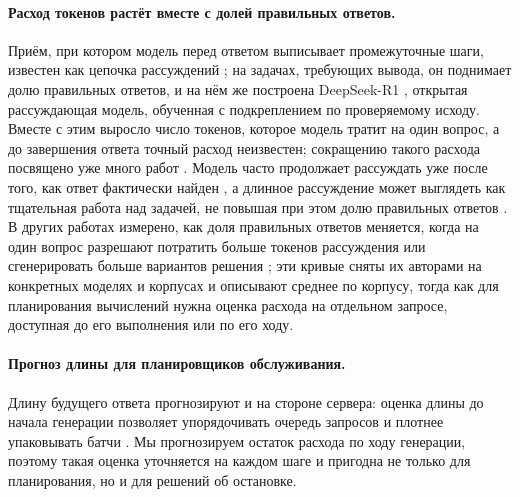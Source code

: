 \documentclass[11pt]{article}
\begin{document}
\paragraph{Расход токенов растёт вместе с долей правильных ответов.} Приём, при котором модель перед ответом выписывает промежуточные шаги, известен как цепочка рассуждений \citep{wei2022cot}; на задачах, требующих вывода, он поднимает долю правильных ответов, и на нём же построена DeepSeek-R1 \citep{deepseekr1}, открытая рассуждающая модель, обученная с подкреплением по проверяемому исходу. Вместе с этим выросло число токенов, которое модель тратит на один вопрос, а до завершения ответа точный расход неизвестен; сокращению такого расхода посвящено уже много работ \citep{sui2025stopoverthinking,qu2025survey}. Модель часто продолжает рассуждать уже после того, как ответ фактически найден \citep{chen2024donot}, а длинное рассуждение может выглядеть как тщательная работа над задачей, не повышая при этом долю правильных ответов \citep{palod2025performative}. В других работах измерено, как доля правильных ответов меняется, когда на один вопрос разрешают потратить больше токенов рассуждения или сгенерировать больше вариантов решения \citep{snell2025scaling,wu2025inference}; эти кривые сняты их авторами на конкретных моделях и корпусах и описывают среднее по корпусу, тогда как для планирования вычислений нужна оценка расхода на отдельном запросе, доступная до его выполнения или по его ходу.

\paragraph{Прогноз длины для планировщиков обслуживания.} Длину будущего ответа прогнозируют и на стороне сервера: оценка длины до начала генерации позволяет упорядочивать очередь запросов и плотнее упаковывать батчи \citep{zheng2023response}. Мы прогнозируем остаток расхода по ходу генерации, поэтому такая оценка уточняется на каждом шаге и пригодна не только для планирования, но и для решений об остановке.
\end{document}
